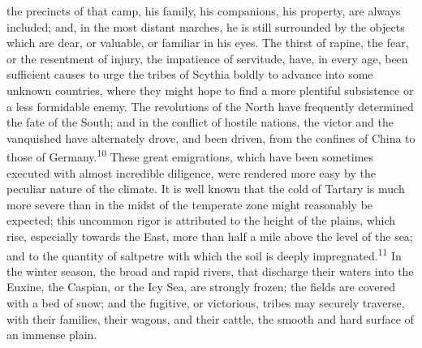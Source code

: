 the precincts of that camp, his family, his companions, his
property, are always included; and, in the most distant marches,
he is still surrounded by the objects which are dear, or
valuable, or familiar in his eyes. The thirst of rapine, the
fear, or the resentment of injury, the impatience of servitude,
have, in every age, been sufficient causes to urge the tribes of
Scythia boldly to advance into some unknown countries, where they
might hope to find a more plentiful subsistence or a less
formidable enemy. The revolutions of the North have frequently
determined the fate of the South; and in the conflict of hostile
nations, the victor and the vanquished have alternately drove,
and been driven, from the confines of China to those of Germany.\textsuperscript{10}
These great emigrations, which have been sometimes executed
with almost incredible diligence, were rendered more easy by the
peculiar nature of the climate. It is well known that the cold of
Tartary is much more severe than in the midst of the temperate
zone might reasonably be expected; this uncommon rigor is
attributed to the height of the plains, which rise, especially
towards the East, more than half a mile above the level of the
sea; and to the quantity of saltpetre with which the soil is
deeply impregnated.\textsuperscript{11} In the winter season, the broad and rapid
rivers, that discharge their waters into the Euxine, the Caspian,
or the Icy Sea, are strongly frozen; the fields are covered with
a bed of snow; and the fugitive, or victorious, tribes may
securely traverse, with their families, their wagons, and their
cattle, the smooth and hard surface of an immense plain.



